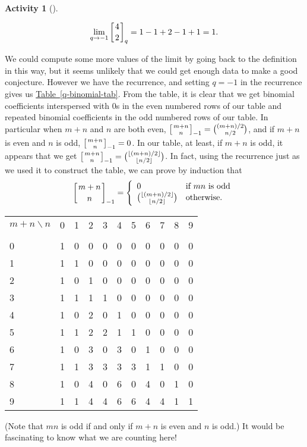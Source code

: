 \documentclass[10pt,]{book}
\theoremstyle{plain}
\theoremstyle{definition}
\newtheorem{activity}[project]{Activity}
\numberwithin{equation}{chapter}
\newcommand{\hrulethin}  {\noalign{\hrule height 0.04em}}
\newcommand{\qchoose}[2]{\left[{#1\atop#2}\right]_q}
\def\neg1choose#1#2{\left[{#1\atop#2}\right]_{-1}}
\newcommand{\amp}{&}
\begin{document}
\begin{activity}[]
\begin{enumerate}[label=(\alph*)]
\begin{equation*}
\lim_{q\rightarrow -1}\qchoose{4}{2}=1-1+2-1+1=1.
\end{equation*}
%
\par
We could compute some more values of the limit by going back to the definition in this way, but it seems unlikely that we could get enough data to make a good conjecture. However we have the recurrence, and setting \(q=-1\) in the recurrence gives us \hyperref[q-binomial-tab]{Table~\ref{q-binomial-tab}}.  From the table, it is clear that we get binomial coefficients interspersed with 0s in the even numbered rows of our table and repeated binomial coefficients in the odd numbered rows of our table. In particular when \(m+n\) and \(n\) are both even, \(\neg1choose{m+n}{n}=\binom{(m+n)/2}{n/2}\), and if \(m+n\) is even and \(n\) is odd, \(\neg1choose{m+n}{n}=0\). In our table, at least, if \(m+n\) is odd, it appears that we get \(\neg1choose{m+n}{n}=\binom{\lfloor(m+n)/2\rfloor}{\lfloor n/2\rfloor}\). In fact, using the recurrence just as we used it to construct the table, we can prove by induction that%
\begin{equation*}
\neg1choose{m+n}{n}=\left\{
\begin{array}{ll}0\amp \mbox{if \(mn\) is odd} \\
\binom{\lfloor(m+n)/2\rfloor}{\lfloor n/2\rfloor}\amp \mbox{otherwise.}
\end{array} \right.
\end{equation*}
%
\begin{table}
\centering
\begin{tabular}{lllllllllll}
\(m+n\backslash n\)&0&1&2&3&4&5&6&7&8&9\tabularnewline[0pt]
&&&&&&&&&&\tabularnewline\hrulethin
0&1&0&0&0&0&0&0&0&0&0\tabularnewline[0pt]
1&1&1&0&0&0&0&0&0&0&0\tabularnewline[0pt]
2&1&0&1&0&0&0&0&0&0&0\tabularnewline[0pt]
3&1&1&1&1&0&0&0&0&0&0\tabularnewline[0pt]
4&1&0&2&0&1&0&0&0&0&0\tabularnewline[0pt]
5&1&1&2&2&1&1&0&0&0&0\tabularnewline[0pt]
6&1&0&3&0&3&0&1&0&0&0\tabularnewline[0pt]
7&1&1&3&3&3&3&1&1&0&0\tabularnewline[0pt]
8&1&0&4&0&6&0&4&0&1&0\tabularnewline[0pt]
9&1&1&4&4&6&6&4&4&1&1
\end{tabular}
\end{table}
(Note that \(mn\) is odd if and only if \(m+n\) is even and \(n\) is odd.) It would be fascinating to know what we are counting here!%

\end{enumerate}
\end{activity}
\typeout{************************************************}
\typeout{************************************************}
\end{document}
